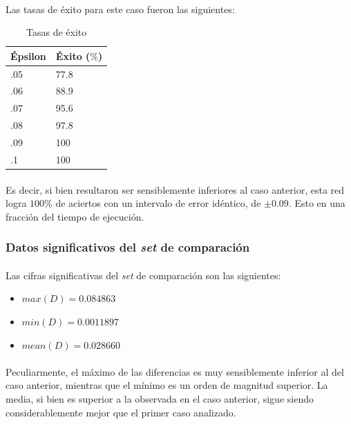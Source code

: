\documentclass[12pt, twocolumn]{article}
\begin{document}
	\paragraph{} Las tasas de éxito para este caso fueron las siguientes:
	
	\begin{table}[H]
		\centering
		\begin{tabular}{ll}
			\hline
			Épsilon & Éxito ($\%$)\\ \hline
			.05     & 77.8  \\
			.06     & 88.9    \\
			.07     & 95.6  \\
			.08     & 97.8  \\
			.09     & 100  \\ 
			.1      & 100  \\ \hline 
		\end{tabular}
		\caption{Tasas de éxito}
		\label{ex3}
	\end{table}
	
	\paragraph{} Es decir, si bien resultaron ser sensiblemente inferiores al caso anterior, esta red logra $100\%$ de aciertos con un intervalo de error idéntico, de $\pm 0.09$. Esto en una fracción del tiempo de ejecución.
	
	\subsubsection{Datos significativos del \textit{set} de comparación}
	
	\paragraph{} Las cifras significativas del \textit{set} de comparación son las siguientes:
	
	\begin{itemize}
		\item $max(D) = 0.084863$
		\item $min(D) = 0.0011897$
		\item $mean(D) = 0.028660$
	\end{itemize} 
	
	\paragraph{} Peculiarmente, el máximo de las diferencias es muy sensiblemente inferior al del caso anterior, mientras que el mínimo es un orden de magnitud superior. La media, si bien es superior a la observada en el caso anterior, sigue siendo considerablemente mejor que el primer caso analizado. 
	
\end{document}
